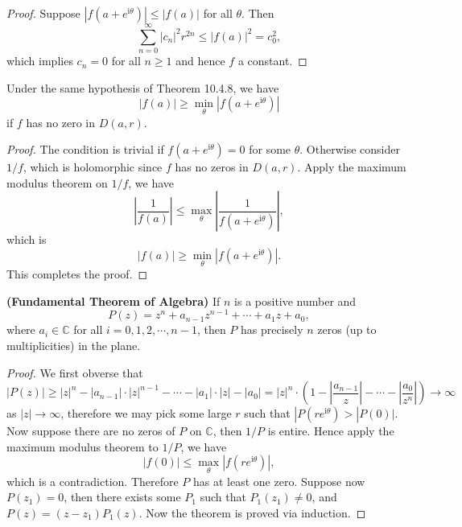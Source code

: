 \begin{proof}
Suppose $\left| f\left( a+e^{\mathrm{i}\theta} \right) \right|\le \left| f\left( a \right) \right|$ for all $\theta$. Then 
$$
\sum_{n=0}^{\infty}{\left| c_n \right|^2r^{2n}}\le \left| f\left( a \right) \right|^2=c_{0}^{2},
$$
which implies $c_n=0$ for all $n\ge 1$ and hence $f$ a constant.
\end{proof}
\begin{corollary}
Under the same hypothesis of Theorem 10.4.8, we have 
$$
\left| f\left( a \right) \right|\ge \min_{\theta} \left| f\left( a+e^{\mathrm{i}\theta} \right) \right|
$$
if $f$ has no zero in $D(a,r)$.
\end{corollary}
\begin{proof}
The condition is trivial if $f(a+e^{\mathrm{i}\theta})=0$ for some $\theta$. Otherwise consider $1/f$, which is holomorphic since $f$ has no zeros in $D(a,r)$. Apply the maximum modulus theorem on $1/f$, we have 
$$
\left| \frac{1}{f\left( a \right)} \right|\le \max_{\theta} \left| \frac{1}{f\left( a+e^{\mathrm{i}\theta} \right)} \right|,
$$
which is 
$$
\left| f\left( a \right) \right|\ge \min_{\theta} \left| f\left( a+e^{\mathrm{i}\theta} \right) \right|.
$$
This completes the proof.
\end{proof}
\begin{theorem}{\textbf{(Fundamental Theorem of Algebra)}}
If $n$ is a positive number and 
$$
P\left( z \right) =z^n+a_{n-1}z^{n-1}+\cdots +a_1z+a_0,
$$
where $a_i\in\mathbb{C}$ for all $i=0,1,2,\cdots,n-1$, then $P$ has precisely $n$ zeros (up to multiplicities) in the plane.
\end{theorem}
\begin{proof}
We first obverse that 
$$
\left| P\left( z \right) \right|\ge \left| z \right|^n-\left| a_{n-1} \right|\cdot \left| z \right|^{n-1}-\cdots -\left| a_1 \right|\cdot \left| z \right|-\left| a_0 \right|=\left| z \right|^n\cdot \left( 1-\left| \frac{a_{n-1}}{z} \right|-\cdots -\left| \frac{a_0}{z^n} \right| \right) \rightarrow \infty 
$$
as $|z|\to\infty$, therefore we may pick some large $r$ such that $|P(re^{\mathrm{i}\theta})>|P(0)|$. Now suppose there are no zeros of $P$ on $\mathbb{C}$, then $1/P$ is entire. Hence apply the maximum modulus theorem to $1/P$, we have 
$$
\left| f\left( 0 \right) \right|\le \max_{\theta} \left| f\left( re^{\mathrm{i}\theta} \right) \right|,
$$
which is a contradiction. Therefore $P$ has at least one zero. Suppose now $P(z_1)=0$, then there exists some $P_1$ such that $P_1(z_1)\ne 0$, and $P(z)=(z-z_1)P_1(z)$. Now the theorem is proved via induction.
\end{proof}
